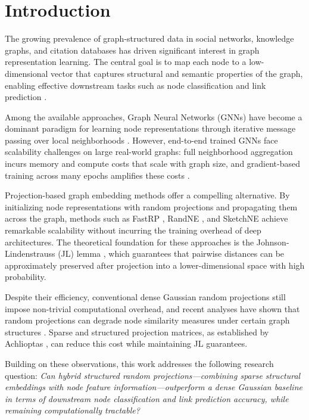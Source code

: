 \documentclass[conference]{IEEEtran}
\begin{document}
\section{Introduction}
\label{sec:intro}

The growing prevalence of graph-structured data in social networks,
knowledge graphs, and citation databases has driven significant interest in
graph representation learning. The central goal is to map each node to a
low-dimensional vector that captures structural and semantic properties of
the graph, enabling effective downstream tasks such as node classification
and link prediction \cite{khemani2024, gkarmpounis2024}.

Among the available approaches, Graph Neural Networks (GNNs) have become a
dominant paradigm for learning node representations through iterative message
passing over local neighborhoods \cite{khemani2024}. However, end-to-end
trained GNNs face scalability challenges on large real-world graphs: full
neighborhood aggregation incurs memory and compute costs that scale with
graph size, and gradient-based training across many epochs amplifies these
costs \cite{bui2023rap}.

Projection-based graph embedding methods offer a compelling alternative. By
initializing node representations with random projections and propagating
them across the graph, methods such as FastRP \cite{chen2019fast}, RandNE
\cite{zhang2018randne}, and SketchNE \cite{xie2023sketchne} achieve
remarkable scalability without incurring the training overhead of deep
architectures. The theoretical foundation for these approaches is the
Johnson-Lindenstrauss (JL) lemma \cite{johnson1984}, which guarantees that
pairwise distances can be approximately preserved after projection into a
lower-dimensional space with high probability.

Despite their efficiency, conventional dense Gaussian random projections
still impose non-trivial computational overhead, and recent analyses have
shown that random projections can degrade node similarity measures under
certain graph structures \cite{tadic2024}. Sparse and structured projection
matrices, as established by Achlioptas \cite{achlioptas2003}, can reduce
this cost while maintaining JL guarantees.

Building on these observations, this work addresses the following research
question: \emph{Can hybrid structured random projections---combining sparse
structural embeddings with node feature information---outperform a dense
Gaussian baseline in terms of downstream node classification and link
prediction accuracy, while remaining computationally tractable?}
\end{document}
